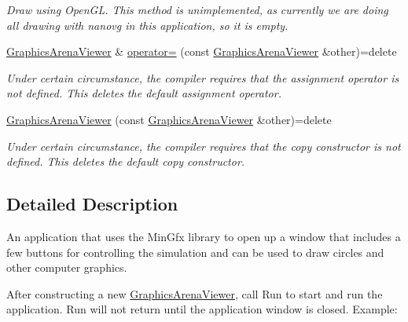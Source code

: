 \begin{DoxyCompactItemize}
\begin{DoxyCompactList}\small\item\em Draw using {\ttfamily Open\+GL}. This method is unimplemented, as currently we are doing all drawing with {\ttfamily nanovg} in this application, so it is empty. \end{DoxyCompactList}\item 
\hyperlink{classGraphicsArenaViewer}{Graphics\+Arena\+Viewer} \& \hyperlink{classGraphicsArenaViewer_a289278f7b338fc60f983827d21b159ff}{operator=} (const \hyperlink{classGraphicsArenaViewer}{Graphics\+Arena\+Viewer} \&other)=delete\hypertarget{classGraphicsArenaViewer_a289278f7b338fc60f983827d21b159ff}{}\label{classGraphicsArenaViewer_a289278f7b338fc60f983827d21b159ff}

\begin{DoxyCompactList}\small\item\em Under certain circumstance, the compiler requires that the assignment operator is not defined. This {\ttfamily deletes} the default assignment operator. \end{DoxyCompactList}\item 
\hyperlink{classGraphicsArenaViewer_afa70b72e0769db0f3f41fe37bc540621}{Graphics\+Arena\+Viewer} (const \hyperlink{classGraphicsArenaViewer}{Graphics\+Arena\+Viewer} \&other)=delete\hypertarget{classGraphicsArenaViewer_afa70b72e0769db0f3f41fe37bc540621}{}\label{classGraphicsArenaViewer_afa70b72e0769db0f3f41fe37bc540621}

\begin{DoxyCompactList}\small\item\em Under certain circumstance, the compiler requires that the copy constructor is not defined. This {\ttfamily deletes} the default copy constructor. \end{DoxyCompactList}\end{DoxyCompactItemize}


\subsection{Detailed Description}
An application that uses the Min\+Gfx library to open up a window that includes a few buttons for controlling the simulation and can be used to draw circles and other computer graphics. 

After constructing a new \hyperlink{classGraphicsArenaViewer}{Graphics\+Arena\+Viewer}, call Run to start and run the application. Run will not return until the application window is closed. Example\+:


